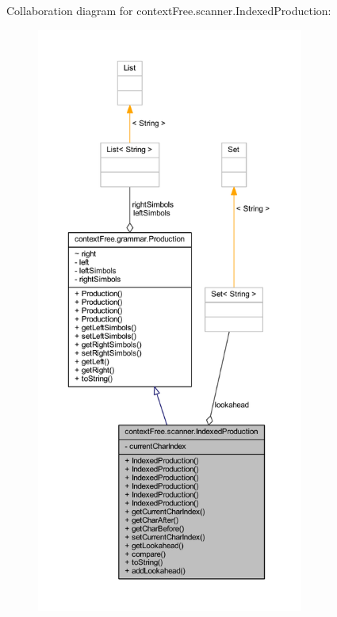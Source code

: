 Collaboration diagram for context\-Free.\-scanner.\-Indexed\-Production\-:\nopagebreak
\begin{figure}[H]
\begin{center}
\leavevmode
\includegraphics[height=550pt]{classcontext_free_1_1scanner_1_1_indexed_production__coll__graph}
\end{center}
\end{figure}
